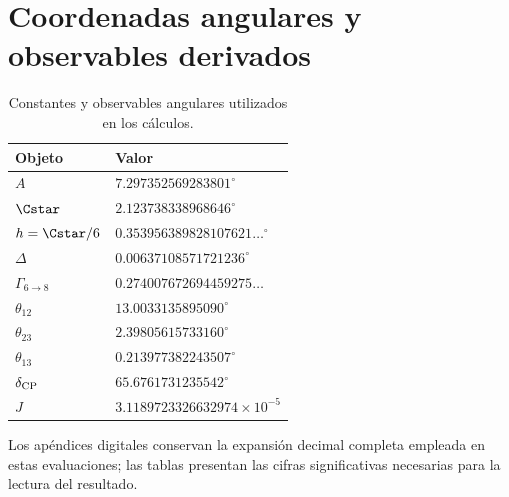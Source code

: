 \section{Coordenadas angulares y observables derivados}

\begin{table}[htbp]
\centering
\caption{Constantes y observables angulares utilizados en los cálculos.}
\label{tab:resumen-angular}
\begin{tabular}{@{}ll@{}}
\toprule
Objeto&Valor\\
\midrule
\(A\)&\(7.297352569283801^\circ\)\\
\(\Cstar\)&\(2.123738338968646^\circ\)\\
\(h=\Cstar/6\)&\(0.353956389828107621\ldots{}^\circ\)\\
\(\Delta\)&\(0.00637108571721236^\circ\)\\
\(\Gamma_{6\to8}\)&\(0.274007672694459275\ldots\)\\
\(\theta_{12}\)&\(13.0033135895090^\circ\)\\
\(\theta_{23}\)&\(2.39805615733160^\circ\)\\
\(\theta_{13}\)&\(0.213977382243507^\circ\)\\
\(\delta_{\rm CP}\)&\(65.6761731235542^\circ\)\\
\(J\)&\(3.1189723326632974\times10^{-5}\)\\
\bottomrule
\end{tabular}
\end{table}

Los apéndices digitales conservan la expansión decimal completa empleada en
estas evaluaciones; las tablas presentan las cifras significativas necesarias
para la lectura del resultado.
